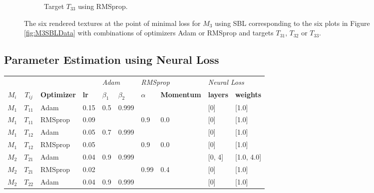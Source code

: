 \begin{figure}[hpt]
\begin{subfigure}[t]{.25\textwidth}
    \caption{Target $T_{33}$ using RMSprop.}
    \label{fig:M3SBLFinalRendersRealLifeRMSprop}
\end{subfigure}
\caption{The six rendered textures at the point of minimal loss for $M_3$ using SBL corresponding to the six plots in Figure \ref{fig:M3SBLData} with combinations of optimizers Adam or RMSprop and targets $T_{31}$, $T_{32}$ or $T_{33}$.}
\label{fig:M3SBLFinalRenders}
\end{figure}

\newpage
\subsection{Parameter Estimation using Neural Loss}

\begin{table}[!h]
\centering
\begin{tabular}{ccllllllll}
\textbf{}      &                   & \textbf{}          & \multicolumn{1}{l|}{}            & \multicolumn{2}{l|}{\textit{Adam}}                           & \multicolumn{2}{l|}{\textit{RMSprop}}                      & \multicolumn{2}{l|}{\textit{Neural Loss}}               \\
\textbf{$M_i$} & \textbf{$T_{ij}$} & \textbf{Optimizer} & \multicolumn{1}{l|}{\textbf{lr}} & \textbf{$\beta_1$} & \multicolumn{1}{l|}{\textbf{$\beta_2$}} & \textbf{$\alpha$} & \multicolumn{1}{l|}{\textbf{Momentum}} & \textbf{layers} & \multicolumn{1}{l|}{\textbf{weights}} \\ \hline
 $M_1$     & $T_{11}$   & Adam       & 0.15       & 0.5        & 0.999      &            &            & [0]        & [1.0]      \\
 $M_1$     & $T_{11}$   & RMSprop    & 0.09       &            &            & 0.9        & 0.0        & [0]        & [1.0]      \\
 $M_1$     & $T_{12}$   & Adam       & 0.05       & 0.7        & 0.999      &            &            & [0]        & [1.0]      \\
 $M_1$     & $T_{12}$   & RMSprop    & 0.05       &            &            & 0.9        & 0.0        & [0]        & [1.0]      \\
  $M_2$     & $T_{21}$   & Adam       & 0.04       & 0.9        & 0.999      &            &            & [0, 4]     & [1.0, 4.0] \\
 $M_2$     & $T_{21}$   & RMSprop    & 0.02       &            &            & 0.99       & 0.4        & [0]        & [1.0]      \\
 $M_2$     & $T_{22}$   & Adam       & 0.04       & 0.9        & 0.999      &            &            & [0]        & [1.0]      \\

\end{tabular}
\end{table}
